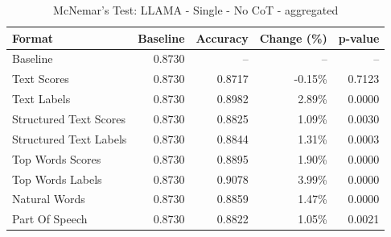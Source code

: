 \begin{table}[htbp]
\centering
\caption{McNemar's Test: LLAMA - Single - No CoT - aggregated}
\label{tab:llama-single-no_chain_of_thought-aggregated}
\begin{tabular}{lrrrr}
\toprule
Format & Baseline & Accuracy & Change (\%) & p-value \\
\midrule
Baseline & 0.8730 & -- & -- & -- \\
Text Scores & 0.8730 & 0.8717 & -0.15\% & 0.7123 \\
Text Labels & 0.8730 & 0.8982 & 2.89\% & 0.0000 \\
Structured Text Scores & 0.8730 & 0.8825 & 1.09\% & 0.0030 \\
Structured Text Labels & 0.8730 & 0.8844 & 1.31\% & 0.0003 \\
Top Words Scores & 0.8730 & 0.8895 & 1.90\% & 0.0000 \\
Top Words Labels & 0.8730 & 0.9078 & 3.99\% & 0.0000 \\
Natural Words & 0.8730 & 0.8859 & 1.47\% & 0.0000 \\
Part Of Speech & 0.8730 & 0.8822 & 1.05\% & 0.0021 \\
\bottomrule
\end{tabular}
\end{table}
